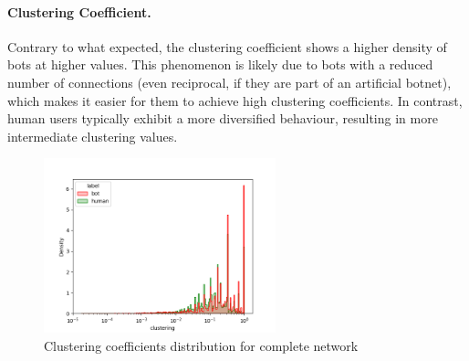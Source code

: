 \documentclass[12pt, a4paper]{article}
\begin{document}
		\paragraph{Clustering Coefficient.} Contrary to what expected, the clustering coefficient shows a higher density of bots at higher values. This phenomenon is likely due to bots with a reduced number of connections (even reciprocal, if they are part of an artificial botnet), which makes it easier for them to achieve high clustering coefficients. In contrast, human users typically exhibit a more diversified behaviour, resulting in more intermediate clustering values.
        \begin{figure}[H]
            \centering
            \includegraphics[width=0.6\textwidth]{complete_clustering_distribution.png}
            \caption{Clustering coefficients distribution for complete network}
        \end{figure}
\end{document}

